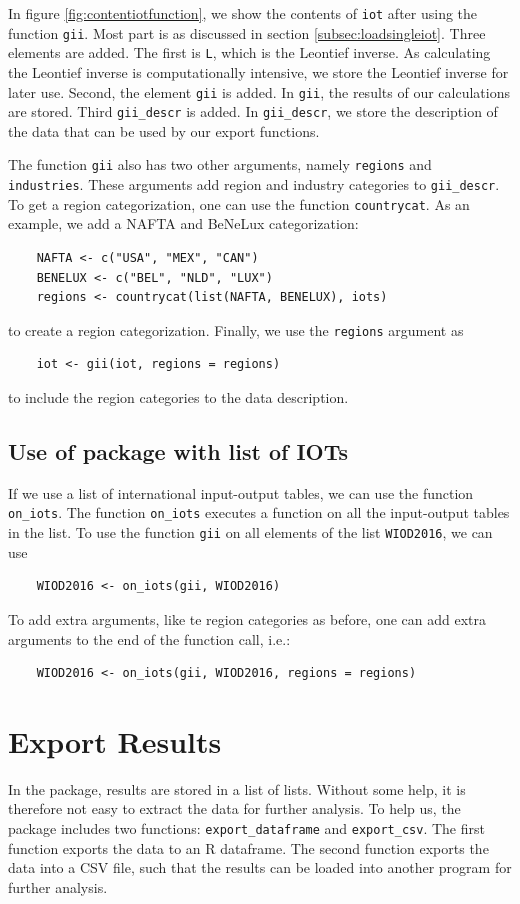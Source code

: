 \documentclass[10pt,a4paper]{paper}
\begin{document}
	In figure \ref{fig:contentiotfunction}, we show the contents of \texttt{iot} after using the function \texttt{gii}. Most part is as discussed in section \ref{subsec:loadsingleiot}. Three elements are added. The first is \texttt{L}, which is the Leontief inverse. As calculating the Leontief inverse is computationally intensive, we store the Leontief inverse for later use. Second, the element \texttt{gii} is added. In \texttt{gii}, the results of our calculations are stored. Third \texttt{gii\_descr} is added. In \texttt{gii\_descr}, we store the description of the data that can be used by our export functions.
	
	The function \texttt{gii} also has two other arguments, namely \texttt{regions} and \texttt{industries}. These arguments add region and industry categories to \texttt{gii\_descr}. To get a region categorization, one can use the function \texttt{countrycat}. As an example, we add a NAFTA and BeNeLux categorization:
	\begin{Verbatim}
	NAFTA <- c("USA", "MEX", "CAN")
	BENELUX <- c("BEL", "NLD", "LUX") 
	regions <- countrycat(list(NAFTA, BENELUX), iots)
	\end{Verbatim} 
	to create a region categorization. Finally, we use the \texttt{regions} argument as
	\begin{Verbatim}
	iot <- gii(iot, regions = regions)
	\end{Verbatim}
	to include the region categories to the data description.
	
	\subsection{Use of package with list of IOTs}
	If we use a list of international input-output tables, we can use the function \texttt{on\_iots}. The function \texttt{on\_iots} executes a function on all the input-output tables in the list. To use the function \texttt{gii} on all elements of the list \texttt{WIOD2016}, we can use
	\begin{Verbatim}
	WIOD2016 <- on_iots(gii, WIOD2016)
	\end{Verbatim}
	To add extra arguments, like te region categories as before, one can add extra arguments to the end of the function call, i.e.:
	\begin{Verbatim}
	WIOD2016 <- on_iots(gii, WIOD2016, regions = regions)
	\end{Verbatim}
	
	\section{Export Results}
	In the package, results are stored in a list of lists. Without some help, it is therefore not easy to extract the data for further analysis. To help us, the package includes two functions: \texttt{export\_dataframe} and \texttt{export\_csv}. The first function exports the data to an R dataframe. The second function exports the data into a CSV file, such that the results can be loaded into another program for further analysis.
\end{document}
